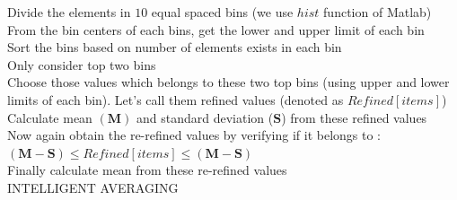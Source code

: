 \documentclass[runningheads]{llncs}
\begin{document}

\begin{algorithm}
	Divide the elements in $10$ equal spaced bins (we use $hist$ function of Matlab)\\
	From the bin centers of each bins, get the  lower and upper limit of each bin\\
	Sort the bins based on number of elements exists in each bin \\
	Only consider top two bins\\
	Choose those values which belongs to these two top bins (using upper and lower limits of each bin). Let's call them refined values (denoted as $Refined[items]$) \\
	Calculate mean $(\mathbf{M})$ and standard deviation ($\mathbf{S}$) from these refined values  \\
	Now again obtain the re-refined values by verifying if it belongs to : $(\mathbf{M} - \mathbf{S}) \leq Refined[items] \leq (\mathbf{M} - \mathbf{S})$\\
	Finally calculate mean from these re-refined values\\
	\caption{INTELLIGENT AVERAGING}
	\label{algo:averageCalc}
\end{algorithm}
\end{document}
